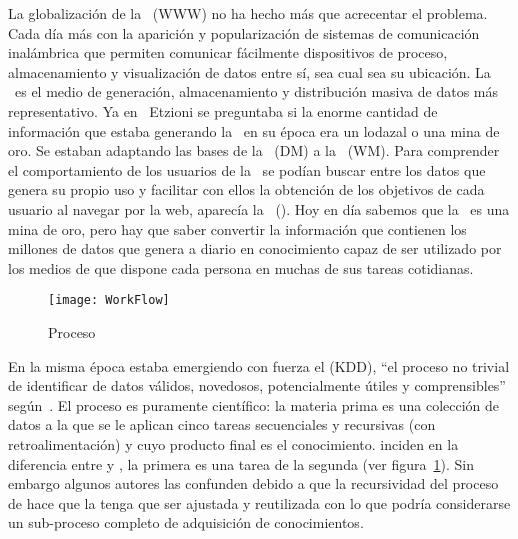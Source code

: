 La globalización de la \www\ (WWW) no ha hecho más que acrecentar el problema. Cada día más con la aparición y popularización de sistemas de comunicación inalámbrica que permiten comunicar fácilmente dispositivos de proceso, almacenamiento y visualización de datos entre sí, sea cual sea su ubicación. La \WWW\ es el medio de generación, almacenamiento y distribución masiva de datos más representativo. Ya en~\cite*{Etzioni-TheWWWQuagmireOrGoldMine-1996} Etzioni se preguntaba si la enorme cantidad de información que estaba generando la \WWW\ en su época era un lodazal o una mina de oro. Se estaban adaptando las bases de la \dm\ (DM) a la \wm\ (WM). Para comprender el comportamiento de los usuarios de la \WWW\ se podían buscar \patrones entre los datos que genera su propio uso y facilitar con ellos la obtención de los objetivos de cada usuario al navegar por la web, aparecía la \wum\ (\WUM).
Hoy en día sabemos que la \WWW\ es una mina de oro, pero hay que saber convertir la información que contienen los millones de datos que genera a diario en conocimiento capaz de ser utilizado por los medios de que dispone cada persona en muchas de sus tareas cotidianas.

\begin{figure}[htbp]
	\centering
  \texttt{[image: WorkFlow]}
  \caption{Proceso \KDD}
\label{fig:resumen-fasesProcesoKDD}
\end{figure}

En la misma época estaba emergiendo con fuerza el \kdd (KDD), "`el proceso no trivial de identificar \patrones de datos válidos, novedosos, potencialmente útiles y comprensibles"' según~\citet{FayyadPiatetskySmyth-FromDataMiningToKnowledgeDiscoveryInDatabases-1996}. El proceso es puramente científico: la materia prima es una colección de datos a la que se le aplican cinco tareas secuenciales y recursivas (con retroalimentación) y cuyo producto final es el conocimiento. \citeauthor*{FayyadPiatetskySmyth-FromDataMiningToKnowledgeDiscoveryInDatabases-1996} inciden en la diferencia entre \dm y \kdd, la primera es una tarea de la segunda (ver figura~\ref{fig:resumen-fasesProcesoKDD}). Sin embargo algunos autores las confunden debido a que la recursividad del proceso de \KDD hace que la \DM tenga que ser ajustada y reutilizada con lo que podría considerarse un sub-proceso completo de adquisición de conocimientos.

